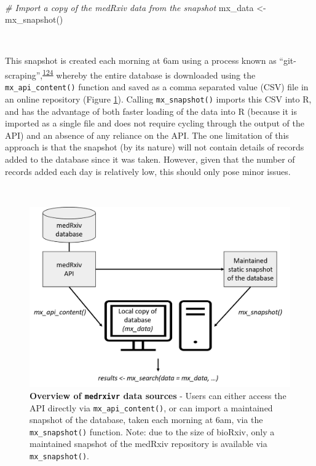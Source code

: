 \documentclass[a4paper, twoside]{templates/ociamthesis}
\newenvironment{Shaded}{\begin{snugshade}}{\end{snugshade}}
\newcommand{\CommentTok}[1]{\textcolor[rgb]{0.56,0.35,0.01}{\textit{#1}}}
\newcommand{\FunctionTok}[1]{\textcolor[rgb]{0.00,0.00,0.00}{#1}}
\newcommand{\NormalTok}[1]{#1}
\newcommand{\OtherTok}[1]{\textcolor[rgb]{0.56,0.35,0.01}{#1}}
\renewenvironment{Shaded}
{
  \vspace{4pt}%
  \begin{snugshade}%
}{%
  \end{snugshade}%
  \vspace{4pt}%
}
\begin{document}
~

\begin{Shaded}
\begin{Highlighting}[]
\CommentTok{\# Import a copy of the medRxiv data from the snapshot}
\NormalTok{mx\_data }\OtherTok{\textless{}{-}} \FunctionTok{mx\_snapshot}\NormalTok{()}
\end{Highlighting}
\end{Shaded}

~

This snapshot is created each morning at 6am using a process known as ``git-scraping'',\textsuperscript{\protect\hyperlink{ref-zotero-15031}{124}} whereby the entire database is downloaded using the \texttt{mx\_api\_content()} function and saved as a comma separated value (CSV) file in an online repository (Figure \ref{fig:medrxivr-data-sources}). Calling \texttt{mx\_snapshot()} imports this CSV into R, and has the advantage of both faster loading of the data into R (because it is imported as a single file and does not require cycling through the output of the API) and an absence of any reliance on the API. The one limitation of this approach is that the snapshot (by its nature) will not contain details of records added to the database since it was taken. However, given that the number of records added each day is relatively low, this should only pose minor issues.

~





\begin{figure}[H]
\includegraphics[width=1\linewidth]{figures/sys-rev-tools/data_sources} \caption[Overview of \texttt{medrxivr} data sources]{\textbf{Overview of \texttt{medrxivr} data sources} - Users can either access the API directly via \texttt{mx\_api\_content()}, or can import a maintained snapshot of the database, taken each morning at 6am, via the \texttt{mx\_snapshot()} function. Note: due to the size of bioRxiv, only a maintained snapshot of the medRxiv repository is available via \texttt{mx\_snapshot()}.}\label{fig:medrxivr-data-sources}
\end{figure}
\end{document}
